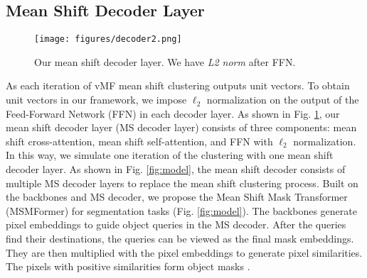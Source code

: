 \documentclass[letterpaper, 10 pt, conference]{ieeeconf}
\begin{document}
\subsection{Mean Shift Decoder Layer} 
\vspace{-1mm}
\label{msdecoderlayer}

\begin{figure}
    \centering
\vspace{-6mm}
\texttt{[image: figures/decoder2.png]}
\vspace{-3mm}
\caption{Our mean shift decoder layer. We have \textit{L2 norm} after FFN.}
\label{fig:decoder}
    \vspace{-6mm}
\end{figure}

As each iteration of vMF mean shift clustering outputs unit vectors. To obtain unit vectors in our framework, we impose $\ell_2$ normalization on the output of the Feed-Forward Network (FFN) in each decoder layer. As shown in Fig. \ref{fig:decoder}, our mean shift decoder layer (MS decoder layer) consists of three components: mean shift cross-attention, mean shift self-attention, and FFN with $\ell_2$ normalization. In this way, we simulate one iteration of the clustering with one mean shift decoder layer. As shown in Fig. \ref{fig:model}, the mean shift decoder consists of multiple MS decoder layers to replace the mean shift clustering process. Built on the backbones and MS decoder, we propose the Mean Shift Mask Transformer (MSMFormer) for segmentation tasks (Fig. \ref{fig:model}). The backbones generate pixel embeddings to guide object queries in the MS decoder. After the queries find their destinations, the queries can be viewed as the final mask embeddings. They are then multiplied with the pixel embeddings to generate pixel similarities. The pixels with positive similarities form object masks \cite{cheng2021per, cheng2022masked}.
\end{document}
